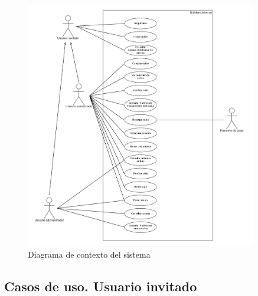 \begin{figure}[H]
    \centering
    \includegraphics[width=0.9\textwidth]{figures/6-Analisis/6-Casos-uso/6_Diagrama-contexto.png}
    \caption{Diagrama de contexto del sistema}
    \label{fig:diagrama_contexto}
\end{figure}

\subsection{Casos de uso. Usuario invitado}

